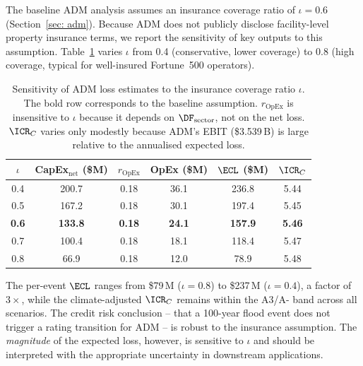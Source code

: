 The baseline ADM analysis assumes an insurance coverage ratio of $\iota = 0.6$ (Section~\ref{sec: adm}). Because ADM does not publicly disclose facility-level property insurance terms, we report the sensitivity of key outputs to this assumption. Table~\ref{tab: insurance sensitivity} varies $\iota$ from 0.4 (conservative, lower coverage) to 0.8 (high coverage, typical for well-insured Fortune~500 operators).

\begin{table}[ht]
\centering
\small
\begin{tabular}{|c|c|c|c|c|c|}
\hline
$\iota$ & CapEx$_{\text{net}}$ (\$M) & $r_{\text{OpEx}}$ & OpEx (\$M) & $\ECL$ (\$M) & $\ICR_C$ \\
\hline
0.4 & 200.7 & 0.18 & 36.1 & 236.8 & 5.44 \\
0.5 & 167.2 & 0.18 & 30.1 & 197.4 & 5.45 \\
\textbf{0.6} & \textbf{133.8} & \textbf{0.18} & \textbf{24.1} & \textbf{157.9} & \textbf{5.46} \\
0.7 & 100.4 & 0.18 & 18.1 & 118.4 & 5.47 \\
0.8 &  66.9 & 0.18 & 12.0 &  78.9 & 5.48 \\
\hline
\end{tabular}
\caption{Sensitivity of ADM loss estimates to the insurance coverage ratio $\iota$. The bold row corresponds to the baseline assumption. $r_{\text{OpEx}}$ is insensitive to $\iota$ because it depends on $\DF_{\text{sector}}$, not on the net loss. $\ICR_C$ varies only modestly because ADM's EBIT (\$3.539\,B) is large relative to the annualised expected loss.}
\label{tab: insurance sensitivity}
\end{table}

The per-event $\ECL$ ranges from \$79\,M ($\iota = 0.8$) to \$237\,M ($\iota = 0.4$), a factor of $3\times$, while the climate-adjusted $\ICR_C$ remains within the A3/A- band across all scenarios. The credit risk conclusion -- that a 100-year flood event does not trigger a rating transition for ADM -- is robust to the insurance assumption. The \textit{magnitude} of the expected loss, however, is sensitive to $\iota$ and should be interpreted with the appropriate uncertainty in downstream applications.

